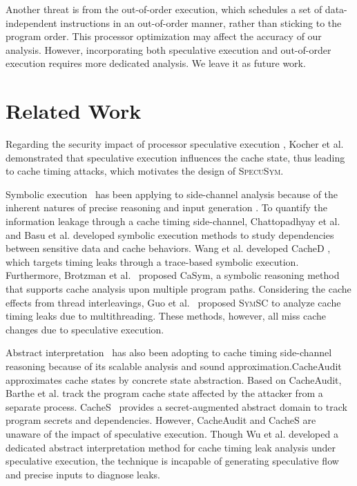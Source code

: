 \documentclass[sigconf]{acmart}
\newcommand\ignore[1]{}
\begin{document}
Another threat is from the out-of-order execution, which schedules a set of 
data-independent instructions in an out-of-order manner, rather than sticking 
to the program order. This processor optimization may affect the accuracy of 
our analysis. However, incorporating both speculative execution and out-of-order 
execution requires more dedicated analysis. We leave it as future work. 


\ignore{
We do not consider the situation that speculative execution leverages Branch 
Target Buffer (BTB) or Return Stack Buffer (RSB) to select the destinations 
of indirect branches. Such vulnerabilities have been effectively mitigated 
by Intel and AMD through Indirect Branch Prediction Barrier (IBPB) settings.
}

\section{Related Work}
\label{sec:related}

Regarding the security impact of processor speculative execution
\cite{kimuraKT1996}, Kocher et al.~\cite{KocherGGHHLMPSY19} demonstrated 
that speculative execution influences the cache state, thus leading to 
cache timing attacks, which motivates the design of \textsc{SpecuSym}. 


Symbolic execution~\cite{King76} has been applying to side-channel analysis 
because of the inherent natures of precise reasoning and input generation
\cite{PasareanuPM16,BangAPPB16,PhanBPMB17,BrennanSB18,BangRB18}.
To quantify the information leakage through a cache timing side-channel, 
Chattopadhyay et al.~\cite{ChattopadhyayBRZ17,Chattopadhyay17} and Basu et al.
\cite{BasuC17} developed symbolic execution methods to study dependencies 
between sensitive data and cache behaviors. Wang et al. developed CacheD
\cite{WangWLZW17}, which targets timing leaks through a trace-based symbolic 
execution. Furthermore, Brotzman et al.~\cite{BrotzmanLZTK2018} proposed 
CaSym, a symbolic reasoning method that supports cache analysis upon multiple 
program paths. Considering the cache effects from thread interleavings, Guo
et al.~\cite{GuoWW18} proposed \textsc{SymSC} to analyze cache timing leaks 
due to multithreading. These methods, however, all miss cache changes due to 
speculative execution.  


Abstract interpretation~\cite{CousotC77} has also been adopting to cache 
timing side-channel reasoning because of its scalable analysis and sound 
approximation.CacheAudit~\cite{DoychevFKMR13} approximates cache states 
by concrete state abstraction. Based on CacheAudit, Barthe et al.
\cite{BartheKMO14} track the program cache state affected by the attacker 
from a separate process. CacheS~\cite{WangBLWZW19} provides a secret-augmented 
abstract domain to track program secrets and dependencies. However, CacheAudit 
and CacheS are unaware of the impact of speculative execution. Though Wu et al.
\cite{WuW19} developed a dedicated abstract interpretation method for cache 
timing leak analysis under speculative execution, the technique is incapable of 
generating speculative flow and precise inputs to diagnose leaks. 
\end{document}
